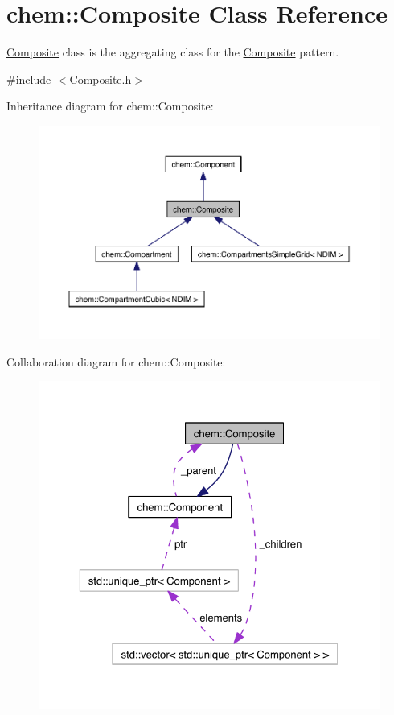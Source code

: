 \hypertarget{classchem_1_1Composite}{\section{chem\-:\-:Composite Class Reference}
\label{classchem_1_1Composite}
}


\hyperlink{classchem_1_1Composite}{Composite} class is the aggregating class for the \hyperlink{classchem_1_1Composite}{Composite} pattern.  




{\ttfamily \#include $<$Composite.\-h$>$}



Inheritance diagram for chem\-:\-:Composite\-:\nopagebreak
\begin{figure}[H]
\begin{center}
\leavevmode
\includegraphics[width=350pt]{classchem_1_1Composite__inherit__graph}
\end{center}
\end{figure}


Collaboration diagram for chem\-:\-:Composite\-:\nopagebreak
\begin{figure}[H]
\begin{center}
\leavevmode
\includegraphics[width=325pt]{classchem_1_1Composite__coll__graph}
\end{center}
\end{figure}
